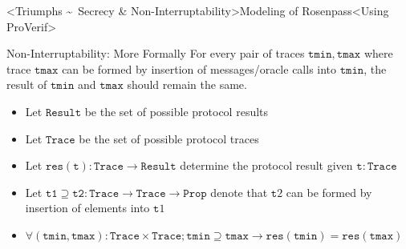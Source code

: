 


\interlude[1]<Triumphs \textasciitilde\ Secrecy \& Non-Interruptability>{Modeling of Rosenpass}<Using ProVerif>


\begin{frame}{Non-Interruptability: More Formally}
    For every pair of traces $\mathtt{tmin}, \mathtt{tmax}$ where trace $\mathtt{tmax}$ can be formed by
    insertion of messages/oracle calls into $\mathtt{tmin}$, the result of $\mathtt{tmin}$ and $\mathtt{tmax}$
    should remain the same.

	

    \begin{itemize}
      \item Let $\mathtt{Result}$ be the set of possible protocol results
      \item Let $\mathtt{Trace}$ be the set of possible protocol traces
      \item Let $\mathtt{res}(\mathtt{t}) : \mathtt{Trace} \to \mathtt{Result}$ determine the protocol result given $\mathtt{t} : \mathtt{Trace}$
      \item Let $\mathtt{t1} \supseteq \mathtt{t2} : \mathtt{Trace} \to \mathtt{Trace} \to \mathtt{Prop}$ denote that $\mathtt{t}2$ can be formed by insertion of elements into $\mathtt{t}1$
      \item $\forall (\mathtt{tmin}, \mathtt{tmax}) : \mathtt{Trace} \times \mathtt{Trace}; \mathtt{tmin} \supseteq \mathtt{tmax} \to \mathtt{res}(\mathtt{tmin}) = \mathtt{res}(\mathtt{tmax})$
    \end{itemize}
\end{frame}

